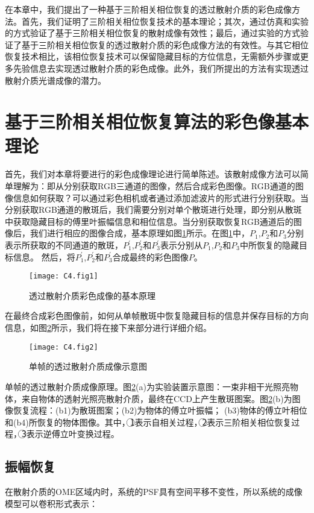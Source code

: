 在本章中，我们提出了一种基于三阶相关相位恢复的透过散射介质的彩色成像方法。首先，我们证明了三阶相关相位恢复技术的基本理论；其次，通过仿真和实验的方式验证了基于三阶相关相位恢复的散射成像有效性；最后，通过实验的方式验证了基于三阶相关相位恢复的透过散射介质的彩色成像方法的有效性。与其它相位恢复技术相比，该相位恢复技术可以保留隐藏目标的方位信息，无需额外步骤或更多先验信息去实现透过散射介质的彩色成像。此外，我们所提出的方法有实现透过散射介质光谱成像的潜力。

\section{基于三阶相关相位恢复算法的彩色像基本理论}

首先，我们对本章将要进行的彩色成像理论进行简单陈述。该散射成像方法可以简单理解为：即从分别获取RGB三通道的图像，然后合成彩色图像。RGB通道的图像信息如何获取？可以通过彩色相机或者通过添加滤波片的形式进行分别获取。当分别获取RGB通道的散斑后，我们需要分别对单个散斑进行处理，即分别从散斑中获取隐藏目标的傅里叶振幅信息和相位信息。当分别获取恢复RGB通道后的图像后，我们进行相应的图像合成，基本原理如图\ref{fig:4.1}所示。在图\ref{fig:4.1}中，$P_1$,$P_2$和$P_3$分别表示所获取的不同通道的散斑，$P_1^{\prime}$,$P_2^{\prime}$和$P_3^{\prime}$表示分别从$P_1$,$P_2$和$P_3$中所恢复的隐藏目标信息。
然后，将$P_1^{\prime}$,$P_2^{\prime}$和$P_3^{\prime}$合成最终的彩色图像$P$。

\begin{figure}[htp]
	\centering
	\texttt{[image: C4.fig1]}
	\caption{透过散射介质彩色成像的基本原理}
	\label{fig:4.1}
\end{figure}
在最终合成彩色图像前，如何从单帧散斑中恢复隐藏目标的信息并保存目标的方向信息，如图\ref{fig:4.2}所示，我们将在接下来部分进行详细介绍。
\begin{figure}[htp]
	\centering
	\texttt{[image: C4.fig2]}
	\caption{单帧的透过散射介质成像示意图}
	\label{fig:4.2}
\end{figure}
单帧的透过散射介质成像原理。图\ref{fig:4.2}(a)为实验装置示意图：一束非相干光照亮物体，来自物体的透射光照亮散射介质，最终在CCD上产生散斑图案。图\ref{fig:4.2}(b)为图像恢复流程：(b1)为散斑图案；(b2)为物体的傅立叶振幅； (b3)物体的傅立叶相位和(b4)所恢复的物体图像。其中，{\large \textcircled{\normalsize 1}}表示自相关过程，{\large \textcircled{\normalsize 2}}表示三阶相关相位恢复过程，{\large \textcircled{\normalsize 3}}表示逆傅立叶变换过程。

\subsection{振幅恢复}
在散射介质的OME区域内时，系统的PSF具有空间平移不变性，所以系统的成像模型可以卷积形式表示：

